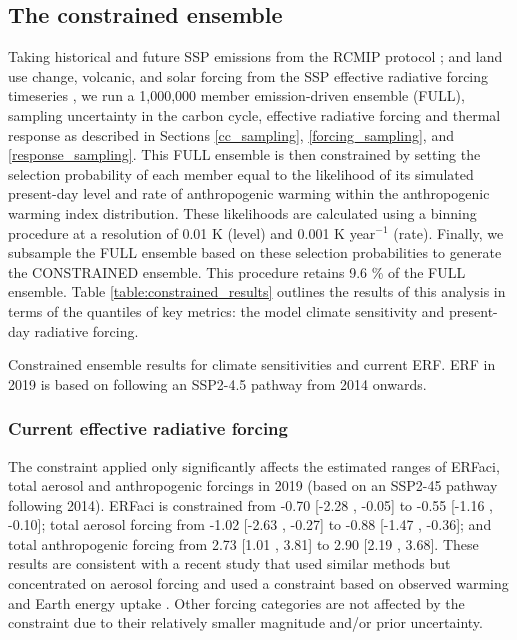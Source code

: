 \documentclass[gmd, manuscript]{copernicus}
\begin{document}
\subsection{The constrained ensemble} \label{NROY_results}
Taking historical and future SSP \citep{Riahi2017} emissions from the RCMIP protocol \citep{Nicholls2019}; and land use change, volcanic, and solar forcing from the SSP effective radiative forcing timeseries \citep{Smith2020c}, we run a 1,000,000 member emission-driven ensemble (FULL), sampling uncertainty in the carbon cycle, effective radiative forcing and thermal response as described in Sections \ref{cc_sampling}, \ref{forcing_sampling}, and \ref{response_sampling}. This FULL ensemble is then constrained by setting the selection probability of each member equal to the likelihood of its simulated present-day level and rate of anthropogenic warming within the anthropogenic warming index distribution. These likelihoods are calculated using a binning procedure at a resolution of 0.01 K (level) and 0.001 K year$^{-1}$ (rate). Finally, we subsample the FULL ensemble based on these selection probabilities to generate the CONSTRAINED ensemble. This procedure retains 9.6 \% of the FULL ensemble. Table \ref{table:constrained_results} outlines the results of this analysis in terms of the quantiles of key metrics: the model climate sensitivity and present-day radiative forcing.
\clearpage
\begin{table}[t]
    \caption{Constrained ensemble results for climate sensitivities and current ERF. ERF in 2019 is based on following an SSP2-4.5 pathway from 2014 onwards.}
    \label{table:constrained_results}
    {\footnotesize
    
    }
\end{table}
\clearpage
\subsubsection{Current effective radiative forcing}
The constraint applied only significantly affects the estimated ranges of ERFaci, total aerosol and anthropogenic forcings in 2019 (based on an SSP2-45 pathway following 2014). ERFaci is constrained from -0.70 [-2.28 , -0.05] to -0.55 [-1.16 , -0.10]; total aerosol forcing from -1.02 [-2.63 , -0.27] to -0.88 [-1.47 , -0.36]; and total anthropogenic forcing from 2.73 [1.01 , 3.81] to 2.90 [2.19 , 3.68]. These results are consistent with a recent study that used similar methods but concentrated on aerosol forcing and used a constraint based on observed warming and Earth energy uptake \citep{Smith2020a}. Other forcing categories are not affected by the constraint due to their relatively smaller magnitude and/or prior uncertainty.
%
\end{document}
